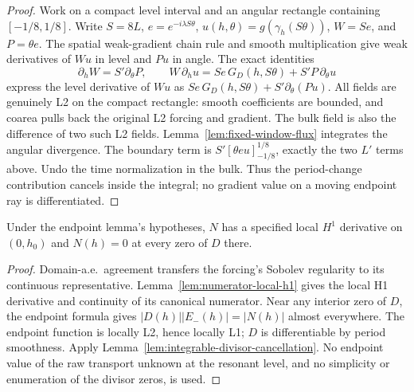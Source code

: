 \begin{proof}
\leanok
Work on a compact level interval and an angular rectangle containing
$[-1/8,1/8]$. Write $S=8L$, $e=e^{-i\lambda S\theta}$,
$u(h,\theta)=g(\gamma_h(S\theta))$, $W=Se$, and $P=\theta e$.
The spatial weak-gradient chain rule and smooth multiplication give
weak derivatives of $Wu$ in level and $Pu$ in angle.
The exact identities
\[
 \partial_hW=S'\partial_\theta P,\qquad
 W\,\partial_hu
   =Se\,G_D(h,S\theta)+S'P\,\partial_\theta u
\]
express the level derivative of $Wu$ as
$Se\,G_D(h,S\theta)+S'\partial_\theta(Pu)$.
All fields are genuinely L2 on the compact rectangle: smooth
coefficients are bounded, and coarea pulls back the original L2
forcing and gradient. The bulk field is also the difference of two
such L2 fields.
Lemma~\ref{lem:fixed-window-flux} integrates the angular divergence.
The boundary term is
$S'[\theta e u]_{-1/8}^{1/8}$, exactly the two $L'$ terms above.
Undo the time normalization in the bulk.
Thus the period-change contribution cancels inside the integral;
no gradient value on a moving endpoint ray is differentiated.
\end{proof}

\begin{lemma}
\label{lem:numerator-zeros}
\leanok
Under the endpoint lemma's hypotheses, $N$ has a specified local $H^1$
derivative on $(0,h_0)$ and $N(h)=0$ at every zero of $D$ there.
\end{lemma}

\begin{proof}
\leanok
Domain-a.e.\ agreement transfers the forcing's Sobolev regularity to
its continuous representative. Lemma~\ref{lem:numerator-local-h1} gives
the local H1 derivative and continuity of its canonical numerator.
Near any interior zero of $D$, the endpoint formula gives
$|D(h)||E_-(h)|=|N(h)|$ almost everywhere.
The endpoint function is locally L2, hence locally L1; $D$ is
differentiable by period smoothness. Apply
Lemma~\ref{lem:integrable-divisor-cancellation}.
No endpoint value of the raw transport unknown at the resonant level,
and no simplicity or enumeration of the divisor zeros, is used.
\end{proof}

